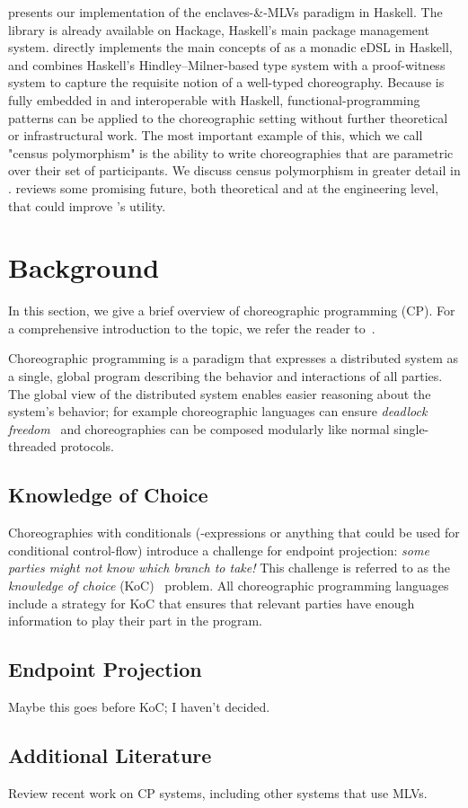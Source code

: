  presents our implementation of the enclaves-\&-MLVs paradigm in Haskell.
The \MultiChor library is already available on Hackage, Haskell's main package management system.
\MultiChor directly implements the main concepts of \HLSCentral as a monadic eDSL in Haskell,
and combines Haskell's Hindley–Milner-based type system with a proof-witness system
to capture the requisite notion of a well-typed choreography.
Because \MultiChor is fully embedded in and interoperable with Haskell,
functional-programming patterns can be applied to the choreographic setting without further theoretical or infrastructural work.
The most important example of this, which we call "census polymorphism" is the ability to write choreographies
that are parametric over their set of participants.
We discuss census polymorphism in greater detail in .
 reviews some promising future, both theoretical and at the engineering level,
that could improve \MultiChor's utility.



\section{Background}
\label{sec:background}
In this section, we give a brief overview of choreographic programming (CP).
For a comprehensive introduction to the topic, we refer the reader to~\cite{montesi_book}.

Choreographic programming is a paradigm that expresses a distributed system
as a single, global program describing the behavior and interactions of all parties.
The global view of the distributed system enables easier reasoning about the system's behavior;
for example choreographic languages can ensure \emph{deadlock freedom}~\cite{montesi-carbone-dfbd}
and choreographies can be composed modularly like normal single-threaded protocols.



\subsection{Knowledge of Choice}
\label{sec:knowledge-of-choice}

Choreographies with conditionals
(-expressions or anything that could be used for conditional control-flow)
introduce
a challenge for endpoint projection:
\emph{some parties might not know which branch to take!}
This challenge is referred to as the \emph{knowledge of choice}  (KoC)~\cite{castagna-knowledge-of-choice} problem.
All choreographic programming languages include a strategy for KoC
that ensures that relevant parties have enough information to play their part in the program.

\subsection{Endpoint Projection}
\label{sec:endpoint-projection}
Maybe this goes before KoC; I haven't decided.

\subsection{Additional Literature}
\label{sec:modern-work}

Review recent work on CP systems, including other systems that use MLVs.





